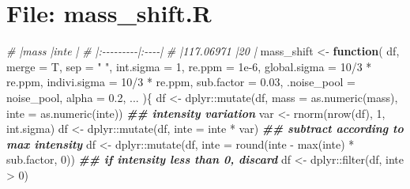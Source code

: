 \documentclass[
]{article}
\newenvironment{Shaded}{\begin{snugshade}}{\end{snugshade}}
\newcommand{\AttributeTok}[1]{\textcolor[rgb]{0.77,0.63,0.00}{#1}}
\newcommand{\CommentTok}[1]{\textcolor[rgb]{0.56,0.35,0.01}{\textit{#1}}}
\newcommand{\ControlFlowTok}[1]{\textcolor[rgb]{0.13,0.29,0.53}{\textbf{#1}}}
\newcommand{\DecValTok}[1]{\textcolor[rgb]{0.00,0.00,0.81}{#1}}
\newcommand{\DocumentationTok}[1]{\textcolor[rgb]{0.56,0.35,0.01}{\textbf{\textit{#1}}}}
\newcommand{\FloatTok}[1]{\textcolor[rgb]{0.00,0.00,0.81}{#1}}
\newcommand{\FunctionTok}[1]{\textcolor[rgb]{0.00,0.00,0.00}{#1}}
\newcommand{\NormalTok}[1]{#1}
\newcommand{\OtherTok}[1]{\textcolor[rgb]{0.56,0.35,0.01}{#1}}
\newcommand{\SpecialCharTok}[1]{\textcolor[rgb]{0.00,0.00,0.00}{#1}}
\newcommand{\StringTok}[1]{\textcolor[rgb]{0.31,0.60,0.02}{#1}}
\begin{document}
\hypertarget{file-mass_shift.r}{%
\section{File: mass\_shift.R}\label{file-mass_shift.r}}

\begin{Shaded}
\begin{Highlighting}[]
\CommentTok{\# |mass      |inte |}
\CommentTok{\# |:{-}{-}{-}{-}{-}{-}{-}{-}{-}|:{-}{-}{-}{-}|}
\CommentTok{\# |117.06971 |20   |}
\NormalTok{mass\_shift }\OtherTok{\textless{}{-}} 
  \ControlFlowTok{function}\NormalTok{(}
\NormalTok{           df,}
           \AttributeTok{merge =}\NormalTok{ T,}
           \AttributeTok{sep =} \StringTok{" "}\NormalTok{,}
           \AttributeTok{int.sigma =} \DecValTok{1}\NormalTok{,}
           \AttributeTok{re.ppm =} \FloatTok{1e{-}6}\NormalTok{,}
           \AttributeTok{global.sigma =} \DecValTok{10}\SpecialCharTok{/}\DecValTok{3} \SpecialCharTok{*}\NormalTok{ re.ppm,}
           \AttributeTok{indivi.sigma =} \DecValTok{10}\SpecialCharTok{/}\DecValTok{3} \SpecialCharTok{*}\NormalTok{ re.ppm,}
           \AttributeTok{sub.factor =} \FloatTok{0.03}\NormalTok{,}
           \AttributeTok{.noise\_pool =}\NormalTok{ noise\_pool,}
           \AttributeTok{alpha =} \FloatTok{0.2}\NormalTok{,}
\NormalTok{           ...}
\NormalTok{           )\{}
\NormalTok{    df }\OtherTok{\textless{}{-}}\NormalTok{ dplyr}\SpecialCharTok{::}\FunctionTok{mutate}\NormalTok{(df, }\AttributeTok{mass =} \FunctionTok{as.numeric}\NormalTok{(mass), }\AttributeTok{inte =} \FunctionTok{as.numeric}\NormalTok{(inte))}
    \DocumentationTok{\#\# intensity variation}
\NormalTok{    var }\OtherTok{\textless{}{-}} \FunctionTok{rnorm}\NormalTok{(}\FunctionTok{nrow}\NormalTok{(df), }\DecValTok{1}\NormalTok{, int.sigma)}
\NormalTok{    df }\OtherTok{\textless{}{-}}\NormalTok{ dplyr}\SpecialCharTok{::}\FunctionTok{mutate}\NormalTok{(df, }\AttributeTok{inte =}\NormalTok{ inte }\SpecialCharTok{*}\NormalTok{ var)}
    \DocumentationTok{\#\# subtract according to max intensity}
\NormalTok{    df }\OtherTok{\textless{}{-}}\NormalTok{ dplyr}\SpecialCharTok{::}\FunctionTok{mutate}\NormalTok{(df, }\AttributeTok{inte =} \FunctionTok{round}\NormalTok{(inte }\SpecialCharTok{{-}} \FunctionTok{max}\NormalTok{(inte) }\SpecialCharTok{*}\NormalTok{ sub.factor, }\DecValTok{0}\NormalTok{))}
    \DocumentationTok{\#\# if intensity less than 0, discard}
\NormalTok{    df }\OtherTok{\textless{}{-}}\NormalTok{ dplyr}\SpecialCharTok{::}\FunctionTok{filter}\NormalTok{(df, inte }\SpecialCharTok{\textgreater{}} \DecValTok{0}\NormalTok{)}

\end{Highlighting}
\end{Shaded}
\end{document}
